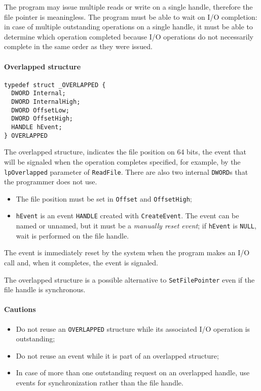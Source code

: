 The program may issue multiple reads or write on a single handle, therefore the file pointer is meaningless. The program must be able to wait on I/O completion: in case of multiple outstanding operations on a single handle, it must be able to determine which operation completed because I/O operations do not necessarily complete in the same order as they were issued.

\paragraph{Overlapped structure}
\begin{verbatim}
typedef struct _OVERLAPPED {
  DWORD Internal;
  DWORD InternalHigh;
  DWORD OffsetLow;
  DWORD OffsetHigh;
  HANDLE hEvent;
} OVERLAPPED  
\end{verbatim}
The overlapped structure, indicates the file position on 64 bits, the event that will be signaled when the operation completes specified, for example, by the \texttt{lpOverlapped} parameter of \texttt{ReadFile}. There are also two internal \texttt{DWORD}s that the programmer does not use.

\begin{itemize}
\item The file position must be set in \texttt{Offset} and \texttt{OffsetHigh};
\item \texttt{hEvent} is an event \texttt{HANDLE} created with \texttt{CreateEvent}. The event can be named or unnamed, but it must be a \emph{manually reset event}; if \texttt{hEvent} is \texttt{NULL}, wait is performed on the file handle.
\end{itemize}
The event is immediately reset by the system when the program makes an I/O call and, when it completes, the event is signaled.

The overlapped structure is a possible alternative to \texttt{SetFilePointer} even if the file handle is synchronous.

\paragraph{Cautions}
\begin{itemize}
\item Do not reuse an \texttt{OVERLAPPED} structure while its associated I/O operation is outstanding;
\item Do not reuse an event while it is part of an overlapped structure;
\item In case of more than one outstanding request on an overlapped handle, use events for synchronization rather than the file handle.
\end{itemize}

